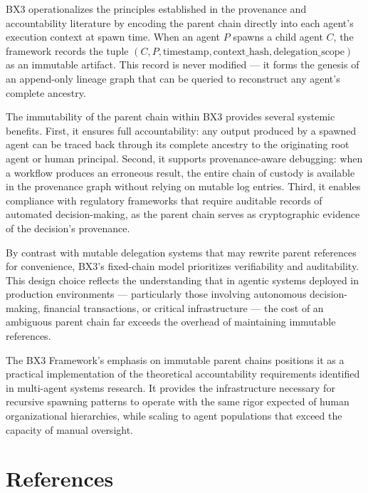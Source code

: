 BX3 operationalizes the principles established in the provenance and accountability literature by encoding the parent chain directly into each agent's execution context at spawn time. When an agent $P$ spawns a child agent $C$, the framework records the tuple $(C, P, \text{timestamp}, \text{context\_hash}, \text{delegation\_scope})$ as an immutable artifact. This record is never modified — it forms the genesis of an append-only lineage graph that can be queried to reconstruct any agent's complete ancestry.

The immutability of the parent chain within BX3 provides several systemic benefits. First, it ensures full accountability: any output produced by a spawned agent can be traced back through its complete ancestry to the originating root agent or human principal. Second, it supports provenance-aware debugging: when a workflow produces an erroneous result, the entire chain of custody is available in the provenance graph without relying on mutable log entries. Third, it enables compliance with regulatory frameworks that require auditable records of automated decision-making, as the parent chain serves as cryptographic evidence of the decision's provenance.

By contrast with mutable delegation systems that may rewrite parent references for convenience, BX3's fixed-chain model prioritizes verifiability and auditability. This design choice reflects the understanding that in agentic systems deployed in production environments — particularly those involving autonomous decision-making, financial transactions, or critical infrastructure — the cost of an ambiguous parent chain far exceeds the overhead of maintaining immutable references.

The BX3 Framework's emphasis on immutable parent chains positions it as a practical implementation of the theoretical accountability requirements identified in multi-agent systems research. It provides the infrastructure necessary for recursive spawning patterns to operate with the same rigor expected of human organizational hierarchies, while scaling to agent populations that exceed the capacity of manual oversight.

\appendix
\section{References}

